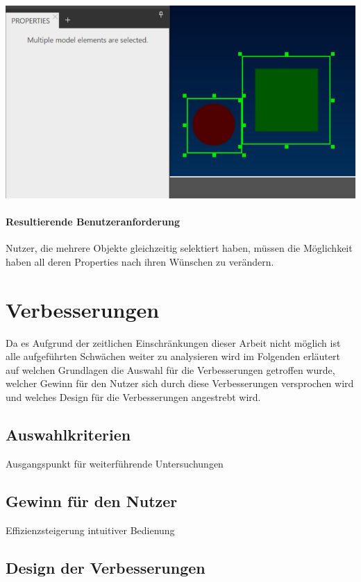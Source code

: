 \begin{center}
  \includegraphics[scale=0.8]{figures/Mehrfachselektion.png}
  \label{fig:Mehrfachselektion}
\end{center}

\paragraph{Resultierende Benutzeranforderung}
Nutzer, die mehrere Objekte gleichzeitig selektiert haben, müssen die Möglichkeit haben all deren Properties nach ihren Wünschen zu verändern.

\section{Verbesserungen}
Da es Aufgrund der zeitlichen Einschränkungen dieser Arbeit nicht möglich ist alle aufgeführten Schwächen weiter zu analysieren wird im Folgenden erläutert auf welchen Grundlagen die Auswahl für die Verbesserungen getroffen wurde, welcher Gewinn für den Nutzer sich durch diese Verbesserungen versprochen wird und welches Design für die Verbesserungen angestrebt wird.

\subsection{Auswahlkriterien}
Ausgangspunkt für weiterführende Untersuchungen

\subsection{Gewinn für den Nutzer}
Effizienzsteigerung
intuitiver Bedienung


\subsection{Design der Verbesserungen}

